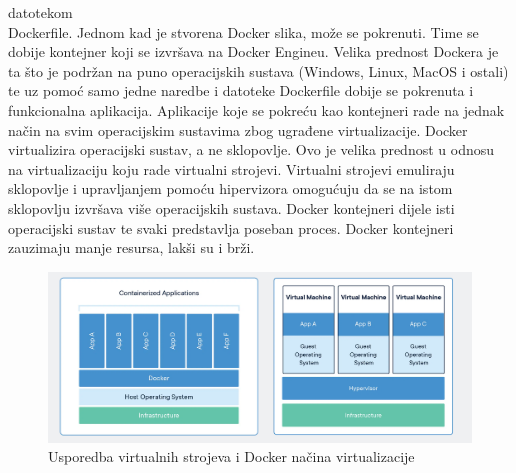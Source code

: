 \documentclass[times, utf8, zavrsni]{fer}
\begin{document}
datotekom \\Dockerfile. Jednom kad je stvorena Docker slika, može se pokrenuti. Time se dobije kontejner koji se izvršava na Docker Engineu. 
Velika prednost Dockera je ta što je podržan na puno operacijskih sustava (Windows, Linux, MacOS i ostali) te uz pomoć samo jedne naredbe i datoteke Dockerfile
dobije se pokrenuta i funkcionalna aplikacija. Aplikacije koje se pokreću kao kontejneri rade na jednak način na svim operacijskim sustavima zbog ugrađene virtualizacije.
Docker virtualizira operacijski sustav, a ne sklopovlje. Ovo je velika prednost u odnosu na virtualizaciju koju rade virtualni strojevi. 
Virtualni strojevi emuliraju sklopovlje i upravljanjem pomoću hipervizora omogućuju da se na istom sklopovlju izvršava više operacijskih sustava. 
Docker kontejneri dijele isti operacijski sustav te svaki predstavlja poseban proces. Docker kontejneri zauzimaju manje 
resursa, lakši su i brži. 

\begin{figure}[htb]
    
    \includegraphics[scale=0.35]{slika2.png}
    \caption{Usporedba virtualnih strojeva i Docker načina virtualizacije}
    \label{fig:docker}
    \end{figure}
\end{document}
